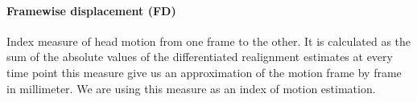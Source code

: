 \documentclass[authoryear]{elsarticle}
\begin{document}
 
% 



\paragraph{Framewise displacement (FD)}
Index measure of head motion from one frame to the other. It is calculated as the sum of the absolute values of the differentiated realignment estimates at every time point \citep{Power2012} this measure give us an approximation of the motion frame by frame in millimeter. We are using this measure as an index of motion estimation.
\end{document}
